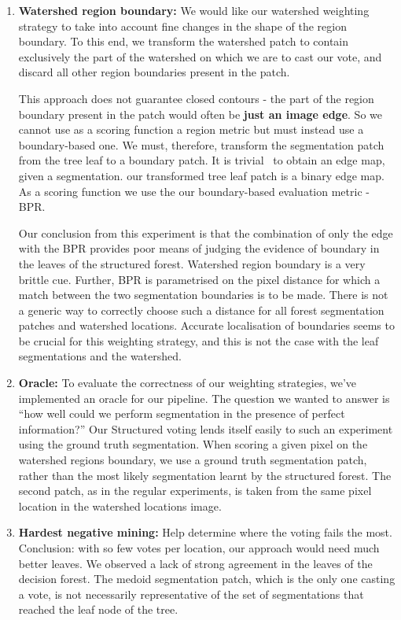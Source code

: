 \begin{enumerate}
\item{\bf Watershed region boundary:} We would like our watershed weighting strategy to take into account fine changes in the shape of the region boundary. To this end, we transform the watershed patch to contain exclusively the part of the watershed on which we are to cast our vote, and discard all other region boundaries present in the patch.

This approach does not guarantee closed contours - the part of the region boundary present in the patch would often be \textbf{just an image edge}. So we cannot use as a scoring function a region metric but must instead use a boundary-based one. We must, therefore, transform the segmentation patch from the tree leaf to a boundary patch. It is trivial~\cite{Arbelaez11} to obtain an edge map, given a segmentation. our transformed tree leaf patch is a binary edge map. As a scoring function we use the our boundary-based evaluation metric - BPR.

Our conclusion from this experiment is that the combination of only the edge with the BPR provides poor means of judging the evidence of boundary in the leaves of the structured forest. Watershed region boundary is a very brittle cue. Further, BPR is parametrised on the pixel distance for which a match between the two segmentation boundaries is to be made. There is not a generic way to correctly choose such a distance for all forest segmentation patches and watershed locations. Accurate localisation of boundaries seems to be crucial for this weighting strategy, and this is not the case with the leaf segmentations and the watershed.

\item{\bf Oracle:} To evaluate the correctness of our weighting strategies, we've implemented an oracle for our pipeline. The question we wanted to answer is ``how well could we perform segmentation in the presence of perfect information?'' Our Structured voting lends itself easily to such an experiment using the ground truth segmentation. When scoring a given pixel on the watershed regions boundary, we use a ground truth segmentation patch, rather than the most likely segmentation learnt by the structured forest. The second patch, as in the regular experiments, is taken from the same pixel location in the watershed locations image.

\item{\bf Hardest negative mining:} Help determine where the voting fails the most. Conclusion: with so few votes per location, our approach would need much better leaves. We observed a lack of strong agreement in the leaves of the decision forest. The medoid segmentation patch, which is the only one casting a vote, is not necessarily representative of the set of segmentations that reached the leaf node of the tree.


\end{enumerate}
